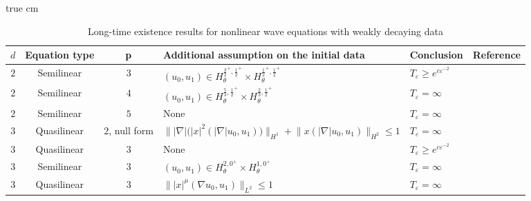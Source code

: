 \documentclass[11pt,twoside]{article}
\theoremstyle{plain}
\theoremstyle{definition}
\theoremstyle{assumption}
\numberwithin{equation}{section}
\begin{document}
	\begin{table}[H]
		\centering
		\caption{Long-time existence results for nonlinear wave equations with weakly decaying data}
		\label{tab:Strichartz-previous-results}
		\renewcommand{\arraystretch}{1.355}
		 true cm
		\begin{tabular}{c|c|c|p{4.6cm}|p{2.5cm}|c}
			\hline
			\(d\)
			&
			{\bf Equation type}
			&
			\({\bf p}\)
			&
			{\bf Additional assumption on the initial data}
			&
			{\bf Conclusion}
			&
			{\bf Reference}
			\\
			\hline
			
			\(2\)
			&
			Semilinear
			&
			\(3\)
			&
			$
			(u_0,u_1)
			\in
			H_{\theta}^{{\frac32}^+,{\frac12}^+}
			\times
			H_{\theta}^{{\frac12}^+,{\frac12}^+}
			$
			&
			$
			T_\varepsilon\ge e^{c\varepsilon^{-2}}
			$
			&
			\cite{FangWang2013}
			\\
			\hline
			\(2\)
			&
			Semilinear
			&
			\(4\)
			&
			$
			(u_0,u_1)
			\in
			H_{\theta}^{\frac53,{\frac12}^+}
			\times
			H_{\theta}^{\frac23,{\frac12}^+}
			$
			&
			$T_\varepsilon=\infty$
			&
			\cite{FangWang2013}
			\\
			\hline
			
			\(2\)
			&
			Semilinear
			&
			\(5\)
			&
			None
			&
			$T_\varepsilon=\infty$
			&
			\cite{FangWang2013}
			\\
			\hline
			
			\(3\)
			&
			Quasilinear
			&
			\(2\), null form
			&
			$\bigl\||\nabla|\bigl(|x|^2(|\nabla|u_0,u_1)\bigr) \bigr\|_{H^1}
            +\bigl\| x(|\nabla|u_0,u_1) \bigr\|_{H^2}\le 1$
			&
			$T_\varepsilon=\infty$
			&
			\cite{Pusateri}
			\\
			\hline
		
			
			\(3\)
			&
			Quasilinear
			&
			\(3\)
			&
			None
			&
			$
			T_\varepsilon\ge e^{c\varepsilon^{-2}}
			$
			&
			\cite{GaoLiYin2026}
			\\
			\hline
			
			
			
			
			
			\(3\)
			&
			Semilinear
			&
			\(3\)
			&
				$
				(u_0,u_1)
				\in
					H_{\theta}^{2,0^+}
				\times
				H_{\theta}^{1,0^+}
			$
			&
			$T_\varepsilon=\infty$
			&
			\cite{MachiharaNakamuraNakanishiOzawa}
			\\
			\hline
			
			\(3\)
			&
			Quasilinear
			&
			\(3\)
			&
			$
			\big\|
			|x|^\mu
			(\nabla u_0,u_1)
			\big\|_{L^2}
			\le 1
			$
			&
			$T_\varepsilon=\infty$
			&
			\cite{GaoLiYin2026}
			\\
			\hline
			

\end{tabular}
\end{table}
\end{document}
